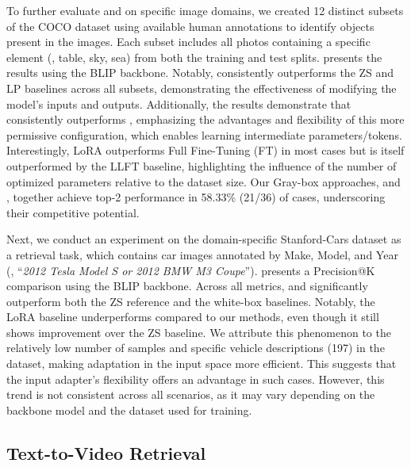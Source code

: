 To further evaluate \ours and \oursp on specific image domains, we created 12 distinct subsets of the COCO dataset using available human annotations to identify objects present in the images. Each subset includes all photos containing a specific element (\eg, table, sky, sea) from both the training and test splits.  presents the results using the BLIP backbone. Notably, \ours consistently outperforms the ZS and LP baselines across all subsets, demonstrating the effectiveness of modifying the model's inputs and outputs. Additionally, the results demonstrate that \oursp consistently outperforms \ours, emphasizing the advantages and flexibility of this more permissive configuration, which enables learning intermediate parameters/tokens.
Interestingly, LoRA outperforms Full Fine-Tuning (FT) in most cases but is itself outperformed by the LLFT baseline, highlighting the influence of the number of optimized parameters relative to the dataset size. Our Gray-box approaches, \ours and \oursp, together achieve top-2 performance in 58.33\% (21/36) of cases, underscoring their competitive potential.


Next, we conduct an experiment on the domain-specific Stanford-Cars dataset \citep{stanford_cars} as a retrieval task, which contains car images annotated by Make, Model, and Year (\eg, ``{\it 2012 Tesla Model S or 2012 BMW M3 Coupe}'').  presents a Precision@K comparison using the BLIP backbone. Across all metrics, \ours and \oursp significantly outperform both the ZS reference and the white-box baselines. Notably, the LoRA baseline underperforms compared to our methods, even though it still shows improvement over the ZS baseline. We attribute this phenomenon to the relatively low number of samples and specific vehicle descriptions (197) in the dataset, making adaptation in the input space more efficient. This suggests that the input adapter's flexibility offers an advantage in such cases. However, this trend is not consistent across all scenarios, as it may vary depending on the backbone model and the dataset used for training.

\subsection{Text-to-Video Retrieval}


